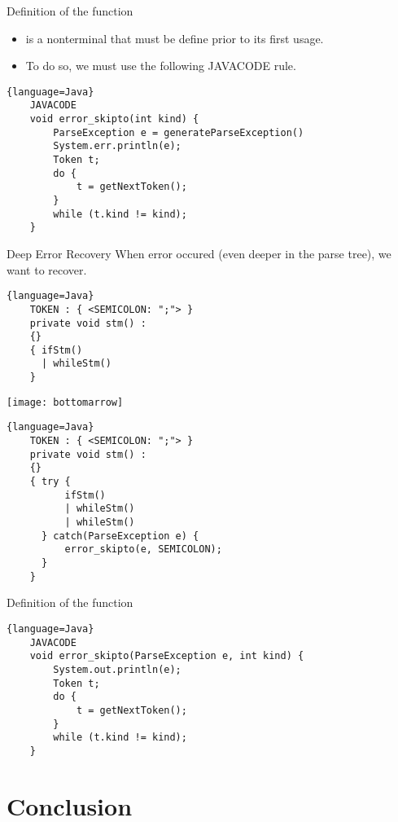 \begin{bibunit}[apalike]
\begin{frame}[fragile]{Definition of the function }
	\begin{itemize}
	\item {} is a nonterminal that must be define prior to its first usage.
	\item To do so, we must use the following JAVACODE rule.
	\end{itemize}
	\begin{lstlisting}{language=Java}
	JAVACODE
	void error_skipto(int kind) {
	    ParseException e = generateParseException()
	    System.err.println(e);
	    Token t;
	    do {
	        t = getNextToken();
	    }
	    while (t.kind != kind);
	}
	\end{lstlisting}
\end{frame}

\begin{frame}[fragile]{Deep Error Recovery}
	When error occured (even deeper in the parse tree), we want to recover. \\
	\begin{lstlisting}{language=Java}
	TOKEN : { <SEMICOLON: ";"> }
	private void stm() :
	{}
	{ ifStm()
	  | whileStm()
	}
	\end{lstlisting}
	\mbox{}\hfill\texttt{[image: bottomarrow]}\hfill\mbox{}
	\begin{lstlisting}{language=Java}
	TOKEN : { <SEMICOLON: ";"> }
	private void stm() :
	{}
	{ try {
	      ifStm()
	      | whileStm()
	      | whileStm()
	  } catch(ParseException e) {
	      error_skipto(e, SEMICOLON);
	  }
	}
	\end{lstlisting}
\end{frame}

\begin{frame}[fragile]{Definition of the function }
	\begin{lstlisting}{language=Java}
	JAVACODE
	void error_skipto(ParseException e, int kind) {
	    System.out.println(e);
	    Token t;
	    do {
	        t = getNextToken();
	    }
	    while (t.kind != kind);
	}
	\end{lstlisting}
\end{frame}

\section{Conclusion}

\tableofcontentslide[sectionstyle={show/shaded},subsectionstyle={hide/hide/hide},subsubsectionstyle={hide/hide/hide/hide}]


\end{bibunit}
